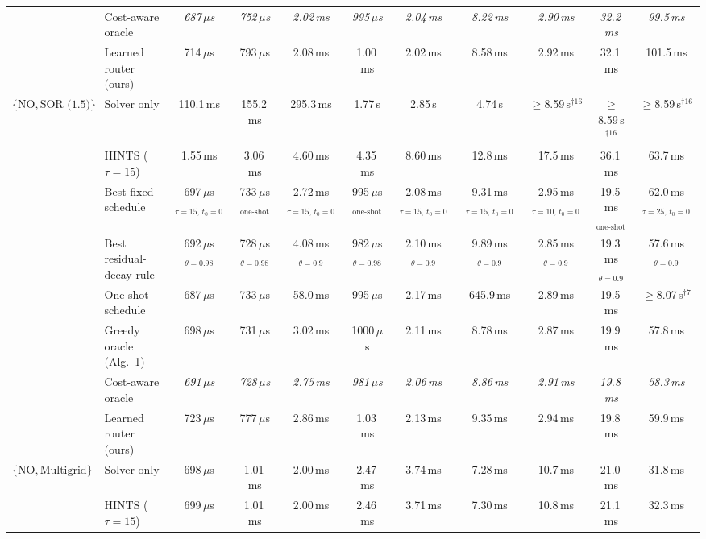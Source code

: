 {\begin{tabular}{llccccccccc}
 & Cost-aware oracle & \textit{687\,$\mu$s} & \textit{752\,$\mu$s} & \textit{2.02\,ms} & \textit{995\,$\mu$s} & \textit{2.04\,ms} & \textit{8.22\,ms} & \textit{2.90\,ms} & \textit{32.2\,ms} & \textit{99.5\,ms} \\
 & Learned router (ours) & 714\,$\mu$s & 793\,$\mu$s & 2.08\,ms & 1.00\,ms & 2.02\,ms & 8.58\,ms & 2.92\,ms & 32.1\,ms & 101.5\,ms \\
\midrule
$\{\mathrm{NO}, \text{SOR (1.5)}\}$ & Solver only & 110.1\,ms & 155.2\,ms & 295.3\,ms & 1.77\,s & 2.85\,s & 4.74\,s & $\geq$8.59\,s$^{\dagger 16}$ & $\geq$8.59\,s$^{\dagger 16}$ & $\geq$8.59\,s$^{\dagger 16}$ \\
 & HINTS ($\tau{=}15$) & 1.55\,ms & 3.06\,ms & 4.60\,ms & 4.35\,ms & 8.60\,ms & 12.8\,ms & 17.5\,ms & 36.1\,ms & 63.7\,ms \\
 & Best fixed schedule & 697\,$\mu$s$_{\tau{=}15,\,t_0{=}0}$ & 733\,$\mu$s$_{\text{one-shot}}$ & 2.72\,ms$_{\tau{=}15,\,t_0{=}0}$ & 995\,$\mu$s$_{\text{one-shot}}$ & 2.08\,ms$_{\tau{=}15,\,t_0{=}0}$ & 9.31\,ms$_{\tau{=}15,\,t_0{=}0}$ & 2.95\,ms$_{\tau{=}10,\,t_0{=}0}$ & 19.5\,ms$_{\text{one-shot}}$ & 62.0\,ms$_{\tau{=}25,\,t_0{=}0}$ \\
 & Best residual-decay rule & 692\,$\mu$s$_{\theta{=}0.98}$ & 728\,$\mu$s$_{\theta{=}0.98}$ & 4.08\,ms$_{\theta{=}0.9}$ & 982\,$\mu$s$_{\theta{=}0.98}$ & 2.10\,ms$_{\theta{=}0.9}$ & 9.89\,ms$_{\theta{=}0.9}$ & 2.85\,ms$_{\theta{=}0.9}$ & 19.3\,ms$_{\theta{=}0.9}$ & 57.6\,ms$_{\theta{=}0.9}$ \\
 & One-shot schedule & 687\,$\mu$s & 733\,$\mu$s & 58.0\,ms & 995\,$\mu$s & 2.17\,ms & 645.9\,ms & 2.89\,ms & 19.5\,ms & $\geq$8.07\,s$^{\dagger 7}$ \\
 & Greedy oracle (Alg.~1) & 698\,$\mu$s & 731\,$\mu$s & 3.02\,ms & 1000\,$\mu$s & 2.11\,ms & 8.78\,ms & 2.87\,ms & 19.9\,ms & 57.8\,ms \\
 & Cost-aware oracle & \textit{691\,$\mu$s} & \textit{728\,$\mu$s} & \textit{2.75\,ms} & \textit{981\,$\mu$s} & \textit{2.06\,ms} & \textit{8.86\,ms} & \textit{2.91\,ms} & \textit{19.8\,ms} & \textit{58.3\,ms} \\
 & Learned router (ours) & 723\,$\mu$s & 777\,$\mu$s & 2.86\,ms & 1.03\,ms & 2.13\,ms & 9.35\,ms & 2.94\,ms & 19.8\,ms & 59.9\,ms \\
\midrule
$\{\mathrm{NO}, \text{Multigrid}\}$ & Solver only & 698\,$\mu$s & 1.01\,ms & 2.00\,ms & 2.47\,ms & 3.74\,ms & 7.28\,ms & 10.7\,ms & 21.0\,ms & 31.8\,ms \\
 & HINTS ($\tau{=}15$) & 699\,$\mu$s & 1.01\,ms & 2.00\,ms & 2.46\,ms & 3.71\,ms & 7.30\,ms & 10.8\,ms & 21.1\,ms & 32.3\,ms \\

\end{tabular}}
